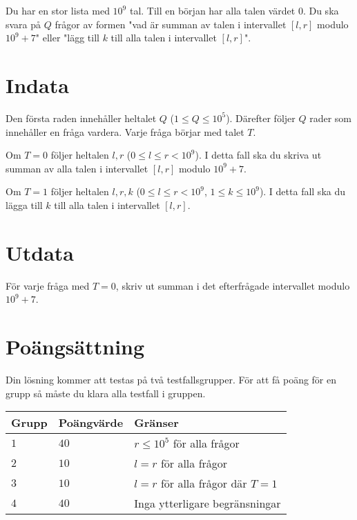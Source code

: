 Du har en stor lista med $10^9$ tal. Till en början har alla talen värdet $0$. Du ska svara på $Q$ frågor av formen "vad är summan av talen i intervallet $[l,r]$ modulo $10^9+7$" eller "lägg till $k$ till alla talen i intervallet $[l,r]$".

\section*{Indata}
Den första raden innehåller heltalet $Q$ ($1 \leq Q \leq 10^5$).
Därefter följer $Q$ rader som innehåller en fråga vardera. Varje fråga börjar med talet $T$.

Om $T=0$ följer heltalen $l,r$ ($0 \leq l \leq r < 10^9$). I detta fall ska du skriva ut summan av alla talen i intervallet $[l,r]$ modulo $10^9+7$.

Om $T=1$ följer heltalen $l,r,k$ ($0 \leq l \leq r < 10^9$, $1 \leq k \leq 10^9$). I detta fall ska du lägga till $k$ till alla talen i intervallet $[l,r]$.

\section*{Utdata}
För varje fråga med $T=0$, skriv ut summan i det efterfrågade intervallet modulo $10^9+7$.

\section*{Poängsättning}
Din lösning kommer att testas på två testfallsgrupper.
\noindent
För att få poäng för en grupp så måste du klara alla testfall i gruppen.

\noindent
\begin{tabular}{| l | l | l |}
\hline
  Grupp & Poängvärde & Gränser \\ \hline
  $1$    & $40$       &  $r \leq 10^5$ för alla frågor \\ \hline
  $2$    & $10$       &  $l=r$ för alla frågor \\ \hline
  $3$    & $10$       &  $l=r$ för alla frågor där $T=1$ \\ \hline
  $4$    & $40$       &  Inga ytterligare begränsningar \\ \hline
\end{tabular}
